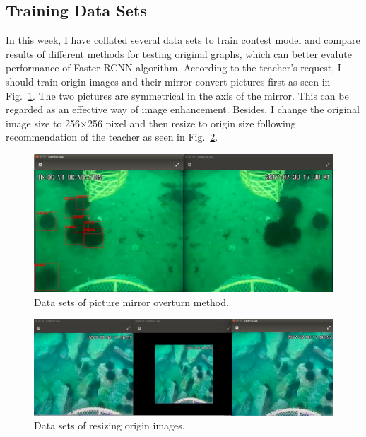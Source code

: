 \documentclass[a4paper]{article}
\begin{document}
	\subsection{Training Data Sets}
	
	In this week, I have collated several data sets to train contest model and compare results of different methods for testing original graphs, which can better evalute performance of Faster RCNN algorithm. According to the teacher's request, I should train origin images and their mirror convert pictures first as seen in Fig.~\ref{p1}. The two pictures are symmetrical in the axis of the mirror. This can be regarded as an effective way of image enhancement. Besides, I change the original image size to 256$\times$256 pixel and then resize to origin size following recommendation of the teacher as seen in Fig.~\ref{p2}.
	\begin{figure}
		\begin{center}
			\includegraphics[scale=0.35]{figures/1.png} 
		\end{center}
		\caption{Data sets of picture mirror overturn method.}
		\label{p1}
	\end{figure}
	
	\begin{figure}
		\begin{center}
			\includegraphics[scale=0.35]{figures/2.png} 
		\end{center}
		\caption{Data sets of resizing origin images.}
		\label{p2}
	\end{figure}
	
\end{document}
